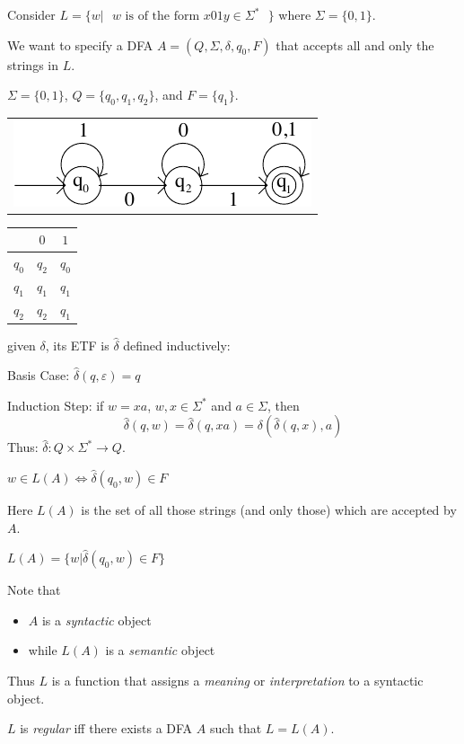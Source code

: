 \begin{frame}
Consider $L=\{w|\text{ $w$ is of the form $x01y\in\Sigma^*$ }\}$ where
$\Sigma=\{0,1\}$.

We want to specify a DFA $A=(Q,\Sigma,\delta,q_0,F)$ that accepts all
and only the strings in $L$.

$\Sigma=\{0,1\}$, $Q=\{q_0,q_1,q_2\}$, and $F=\{q_1\}$.

\begin{tabular}{l}
\includegraphics{figures/1.pdf}
\end{tabular}

\begin{tabular}{c||c|c}
       & $0$   & $1$   \\\hline\hline
$q_0$  & $q_2$ & $q_0$ \\\hline
$q_1$  & $q_1$ & $q_1$ \\\hline
$q_2$  & $q_2$ & $q_1$
\end{tabular}
\end{frame}

\begin{frame}
  given $\delta$, its ETF is
$\hat\delta$ defined inductively:

Basis Case: $\hat\delta(q,\varepsilon)=q$

Induction Step: if $w=xa$, $w,x\in\Sigma^*$ and $a\in\Sigma$, then
$$
\hat\delta(q,w)=\hat\delta(q,xa)=\delta(\hat\delta(q,x),a)
$$ 
Thus: $\hat\delta:Q\times\Sigma^*\longrightarrow Q$.

$w\in L(A) \iff \hat\delta(q_0,w)\in F$

Here $L(A)$ is the set of all those strings (and only those) which are
accepted by $A$.
\end{frame}

\begin{frame}
 $L(A)=\{w|\hat\delta(q_0,w)\in F\}$

Note that
\begin{itemize}
\item $A$ is a {\em syntactic} object
\item while $L(A)$ is a {\em semantic} object
\end{itemize}
Thus $L$ is a function that assigns a {\em meaning} or {\em
interpretation} to a syntactic object.

 $L$ is {\em regular} iff there exists a DFA
$A$ such that $L=L(A)$.
\end{frame}

